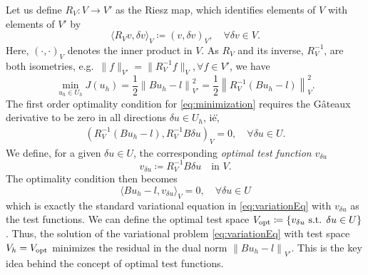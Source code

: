 \documentclass{report}
\newcommand{\eqnlab}[1]{\label{eq:#1}}
\newcommand{\eqnref}[1]{\eqref{eq:#1}}
\newcommand{\nor}[1]{\left\| #1 \right\|}
\begin{document}
Let us define $R_V: V \to V'$ as the Riesz map, which identifies
elements of $V$ with elements of $V'$ by 
\[
\langle R_V v,\delta
v\rangle_V \coloneqq(v, \delta v)_V, \quad \forall \delta v \in V.
\]
Here, $(\cdot, \cdot)_V$ denotes the
inner product in $V$. As $R_V$ and its inverse, $R_V^{-1}$, are both
isometries, e.g.\ $\|f\|_{V'} = \|R_V^{-1} f\|_V, \forall f \in V'$, we
have
\begin{equation}
\eqnlab{minimization}
\min_{u_h\in U_h} J(u_h) = \frac{1}{2}\left\|Bu_h-l\right\|_{V'}^2 =  \frac{1}{2}\left\|R_V^{-1}(Bu_h-l)\right\|_V^2.
\end{equation}
The first order optimality condition for \eqnref{minimization} requires
the G\^ateaux derivative to be zero in all directions $\delta u \in
U_h$, i\.e\.,
\begin{align*}
\left(R_V^{-1}(Bu_h-l),R_V^{-1}B\delta u\right)_V = 0, \quad \forall \delta u \in U. 
\end{align*}
We define, for a given $\delta u \in U$, the corresponding {\em optimal test function} $v_{\delta u}$
\begin{equation}
\eqnlab{optv}
v_{\delta u} \coloneqq R_V^{-1}B\delta u \quad  \text{in } V.
\end{equation} 
The optimality condition then becomes
\[
 \langle Bu_h-l, v_{\delta u}\rangle_V = 0, \quad \forall \delta u \in U
\]
which is exactly the standard variational equation in
 \eqnref{variationEq} with $v_{\delta u}$ as the test functions. We can define the optimal test space $V_{\rm opt} \coloneqq \{v_{\delta u} \text{ s.t. } \delta u\in U\}$. Thus, the solution of the variational problem \eqnref{variationEq} with test space $V_h = V_{\rm opt}$ minimizes the residual in the dual norm $\nor{Bu_h-l}_{V'}$. This is the key idea behind the concept of optimal test functions. 
\end{document}
